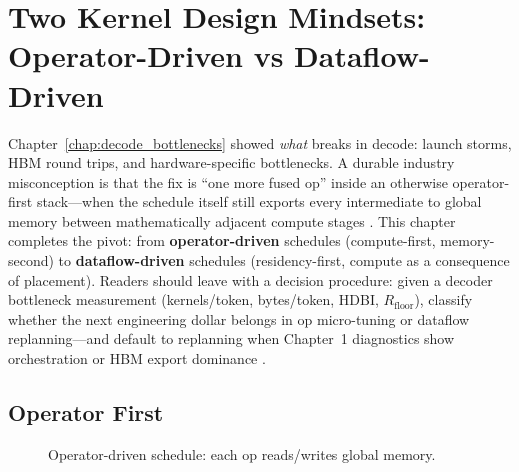 \chapter{Two Kernel Design Mindsets: Operator-Driven vs Dataflow-Driven}
\label{chap:dataflow_mindset}

Chapter~\ref{chap:decode_bottlenecks} showed \emph{what} breaks in decode: launch storms, HBM round trips, and hardware-specific bottlenecks.
A durable industry misconception is that the fix is ``one more fused op'' inside an otherwise operator-first stack---when the schedule itself still exports every intermediate to global memory between mathematically adjacent compute stages \citep{taxbreak2026,memoryfloor2026}.
This chapter completes the pivot: from \textbf{operator-driven} schedules (compute-first, memory-second) to \textbf{dataflow-driven} schedules (residency-first, compute as a consequence of placement).
Readers should leave with a decision procedure: given a decoder bottleneck measurement (kernels/token, bytes/token, HDBI, $R_{\mathrm{floor}}$), classify whether the next engineering dollar belongs in op micro-tuning or dataflow replanning---and default to replanning when Chapter~1 diagnostics show orchestration or HBM export dominance \citep{taxbreak2026,memoryfloor2026}.

\section{Operator First}
\label{sec:operator_first}
\begin{figure}[t]
\centering
{}
\caption{Operator-driven schedule: each op reads/writes global memory.}
\label{fig:operator_graph}
\end{figure}


